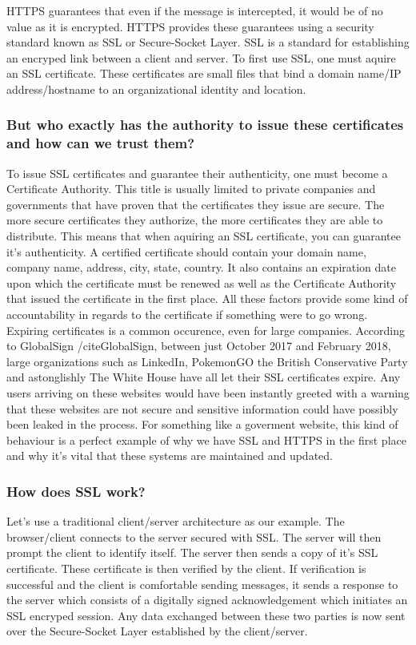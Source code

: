     HTTPS guarantees that even if the message is intercepted, it would be of no value as it is encrypted. HTTPS provides these guarantees using a security standard known as SSL or Secure-Socket Layer.
    SSL is a standard for establishing an encryped link between a client and server. To first use SSL, one must aquire an SSL certificate. These certificates are small files that bind a domain name/IP address/hostname to an organizational identity and location.

    \subsubsection{But who exactly has the authority to issue these certificates and how can we trust them?}
    To issue SSL certificates and guarantee their authenticity, one must become a Certificate Authority. 
    This title is usually limited to private companies and governments that have proven that the certificates they issue are secure. The more secure certificates they authorize, the more certificates they are able to distribute. 
    This means that when aquiring an SSL certificate, you can guarantee it's authenticity. A certified certificate should contain your domain name, company name, address, city, state, country. It also contains an expiration date upon which the certificate must be renewed as well as the Certificate Authority that issued the certificate in the first place.
    All these factors provide some kind of accountability in regards to the certificate if something were to go wrong. Expiring certificates is a common occurence, even for large companies. According to GlobalSign /cite{GlobalSign}, between just October 2017 and February 2018, large organizations such as LinkedIn, PokemonGO the British Conservative Party and astonglishly The White House 
    have all let their SSL certificates expire. Any users arriving on these websites would have been instantly greeted with a warning that these websites are not secure and sensitive information could have possibly been leaked in the process. For something like a goverment website, this kind of behaviour is a perfect example of why we have SSL and HTTPS in the first place and why it's vital that these systems are maintained and updated.

    \subsubsection{How does SSL work?}
    Let's use a traditional client/server architecture as our example. The browser/client connects to the server secured with SSL. The server will then prompt the client to identify itself.
    The server then sends a copy of it's SSL certificate. These certificate is then verified by the client. If verification is successful and the client is comfortable sending messages, it sends a response to the server which consists of a digitally signed acknowledgement which initiates an SSL encryped session.
    Any data exchanged between these two parties is now sent over the Secure-Socket Layer established by the client/server.


